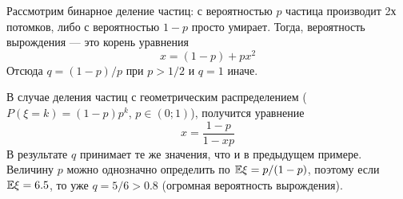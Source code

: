 \begin{example}
	Рассмотрим бинарное деление частиц: с вероятностью $p$ частица производит 2х потомков, либо с вероятностью $1 - p$ просто умирает. Тогда, вероятность вырождения --- это корень уравнения
	\[
		x = (1 - p) + px^2
	\]
	Отсюда $q = (1 - p) / p$ при $p > 1 / 2$ и $q = 1$ иначе.
\end{example}

\begin{example}
	В случае деления частиц с геометрическим распределением ($P(\xi = k) = (1 - p)p^k$, $p \in (0; 1)$), получится уравнение
	\[
		x = \frac{1 - p}{1 - xp}
	\]
	В результате $q$ принимает те же значения, что и в предыдущем примере. Величину $p$ можно однозначно определить по $\mathbb{E}\xi = p / (1 - p)$, поэтому если $\mathbb{E}\xi = 6.5$, то уже $q = 5 / 6 > 0.8$ (огромная вероятность вырождения).
\end{example}